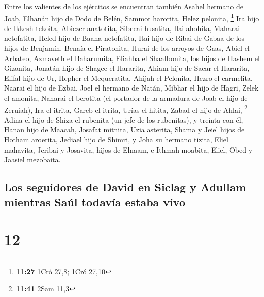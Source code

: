  Entre los valientes de los ejércitos se encuentran
también Asahel hermano de Joab, Elhanán hijo de Dodo de Belén,
 Sammot harorita, Helez pelonita, \footnote{\textbf{11:27}
  1Cró 27,8; 1Cró 27,10}  Ira hijo de Ikkesh tekoita,
Abiezer anatotita,  Sibecai husatita, Ilai ahohita,
 Maharai netofatita, Heled hijo de Baana netofatita,
 Itai hijo de Ribai de Gabaa de los hijos de Benjamín,
Benaía el Piratonita,  Hurai de los arroyos de Gaas,
Abiel el Arbateo,  Azmaveth el Baharumita, Eliahba el
Shaalbonita,  los hijos de Hashem el Gizonita, Jonatán
hijo de Shagee el Hararita,  Ahiam hijo de Sacar el
Hararita, Elifal hijo de Ur,  Hepher el Mequeratita,
Ahijah el Pelonita,  Hezro el carmelita, Naarai el hijo
de Ezbai,  Joel el hermano de Natán, Mibhar el hijo de
Hagri,  Zelek el amonita, Naharai el berotita (el
portador de la armadura de Joab el hijo de Zeruiah),  Ira
el itrita, Gareb el itrita,  Urías el hitita, Zabad el
hijo de Ahlai, \footnote{\textbf{11:41} 2Sam 11,3}  Adina
el hijo de Shiza el rubenita (un jefe de los rubenitas), y treinta con
él,  Hanan hijo de Maacah, Josafat mitnita,
 Uzia asterita, Shama y Jeiel hijos de Hotham aroerita,
 Jediael hijo de Shimri, y Joha su hermano tizita,
 Eliel mahavita, Jeribai y Josavita, hijos de Elnaam, e
Ithmah moabita,  Eliel, Obed y Jaasiel mezobaita.

\hypertarget{los-seguidores-de-david-en-siclag-y-adullam-mientras-sauxfal-todavuxeda-estaba-vivo}{%
\subsection{Los seguidores de David en Siclag y Adullam mientras Saúl
todavía estaba
vivo}\label{los-seguidores-de-david-en-siclag-y-adullam-mientras-sauxfal-todavuxeda-estaba-vivo}}

\hypertarget{section-11}{%
\section{12}\label{section-11}}

